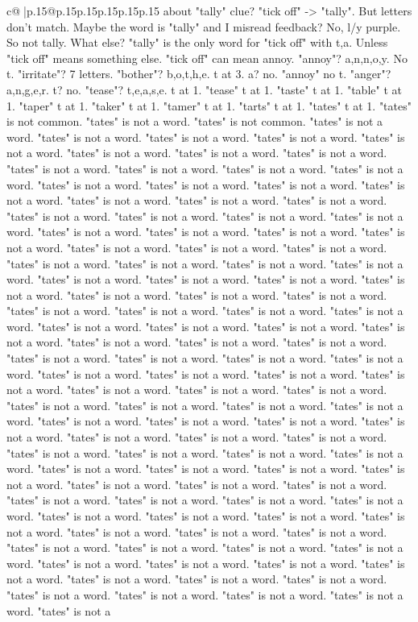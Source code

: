 \documentclass{article}
\begin{document}
{\begin{supertabular}{c@{$\;$}|p{.15\linewidth}@{}p{.15\linewidth}p{.15\linewidth}p{.15\linewidth}p{.15\linewidth}p{.15\linewidth}}
{{{about "tally" clue? "tick off" {-}> "tally". But letters don't match. Maybe the word is "tally" and I misread feedback? No, l/y purple. So not tally. What else? "tally" is the only word for "tick off" with t,a. Unless "tick off" means something else. "tick off" can mean annoy. "annoy"? a,n,n,o,y. No t. "irritate"? 7 letters. "bother"? b,o,t,h,e. t at 3. a? no. "annoy" no t. "anger"? a,n,g,e,r. t? no. "tease"? t,e,a,s,e. t at 1. "tease" t at 1. "taste" t at 1. "table" t at 1. "taper" t at 1. "taker" t at 1. "tamer" t at 1. "tarts" t at 1. "tates" t at 1. "tates" is not common. "tates" is not a word. "tates" is not common. "tates" is not a word. "tates" is not a word. "tates" is not a word. "tates" is not a word. "tates" is not a word. "tates" is not a word. "tates" is not a word. "tates" is not a word. "tates" is not a word. "tates" is not a word. "tates" is not a word. "tates" is not a word. "tates" is not a word. "tates" is not a word. "tates" is not a word. "tates" is not a word. "tates" is not a word. "tates" is not a word. "tates" is not a word. "tates" is not a word. "tates" is not a word. "tates" is not a word. "tates" is not a word. "tates" is not a word. "tates" is not a word. "tates" is not a word. "tates" is not a word. "tates" is not a word. "tates" is not a word. "tates" is not a word. "tates" is not a word. "tates" is not a word. "tates" is not a word. "tates" is not a word. "tates" is not a word. "tates" is not a word. "tates" is not a word. "tates" is not a word. "tates" is not a word. "tates" is not a word. "tates" is not a word. "tates" is not a word. "tates" is not a word. "tates" is not a word. "tates" is not a word. "tates" is not a word. "tates" is not a word. "tates" is not a word. "tates" is not a word. "tates" is not a word. "tates" is not a word. "tates" is not a word. "tates" is not a word. "tates" is not a word. "tates" is not a word. "tates" is not a word. "tates" is not a word. "tates" is not a word. "tates" is not a word. "tates" is not a word. "tates" is not a word. "tates" is not a word. "tates" is not a word. "tates" is not a word. "tates" is not a word. "tates" is not a word. "tates" is not a word. "tates" is not a word. "tates" is not a word. "tates" is not a word. "tates" is not a word. "tates" is not a word. "tates" is not a word. "tates" is not a word. "tates" is not a word. "tates" is not a word. "tates" is not a word. "tates" is not a word. "tates" is not a word. "tates" is not a word. "tates" is not a word. "tates" is not a word. "tates" is not a word. "tates" is not a word. "tates" is not a word. "tates" is not a word. "tates" is not a word. "tates" is not a word. "tates" is not a word. "tates" is not a word. "tates" is not a word. "tates" is not a word. "tates" is not a word. "tates" is not a word. "tates" is not a word. "tates" is not a word. "tates" is not a word. "tates" is not a word. "tates" is not a word. "tates" is not a word. "tates" is not a word. "tates" is not a word. "tates" is not a word. "tates" is not a word. "tates" is not a word. "tates" is not a word. "tates" is not a word. "tates" is not a word. "tates" is not a word. "tates" is not a word. "tates" is not a word. "tates" is not a }}}
\end{supertabular}}
\end{document}
